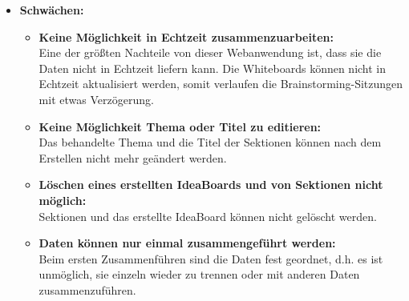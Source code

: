 \begin{itemize}
\item \textbf{Schwächen:}
\begin{itemize}
\item \textbf{Keine Möglichkeit in Echtzeit zusammenzuarbeiten:}\\
Eine der größten Nachteile von dieser Webanwendung ist, dass sie die Daten nicht in Echtzeit liefern kann.  Die Whiteboards können nicht in Echtzeit aktualisiert werden, somit verlaufen die Brainstorming-Sitzungen mit etwas Verzögerung.
\item \textbf{Keine Möglichkeit Thema oder Titel zu editieren: }\\
Das behandelte Thema und die Titel der Sektionen können nach dem Erstellen nicht mehr geändert werden.
\item \textbf{Löschen eines erstellten IdeaBoards und von Sektionen nicht möglich:}\\
Sektionen und das erstellte IdeaBoard können nicht gelöscht werden.
\item \textbf{Daten können nur einmal zusammengeführt werden:}\\
Beim ersten Zusammenführen sind die Daten fest geordnet, d.h. es ist unmöglich, sie einzeln wieder zu trennen oder mit anderen Daten zusammenzuführen. 
\end{itemize}
\end{itemize}

